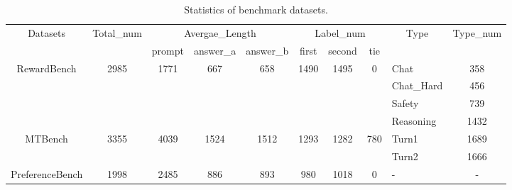 \documentclass[sigconf]{acmart}
\begin{document}
\begin{table}[ht]
\caption{Statistics of benchmark datasets.}
\begin{tabular}{c|c|ccc|ccc|lc}
\hline
\multirow{2}{*}{Datasets}    & \multirow{2}{*}{Total\_num} & \multicolumn{3}{c|}{Avergae\_Length}                                  & \multicolumn{3}{c|}{Label\_num}                                      & \multicolumn{1}{c}{\multirow{2}{*}{Type}} & \multirow{2}{*}{Type\_num} \\
                             &                             & prompt                & answer\_a             & answer\_b             & first                 & second                & tie                  & \multicolumn{1}{c}{}                      &                            \\ \hline
\multirow{4}{*}{RewardBench} & \multirow{4}{*}{2985}       & \multirow{4}{*}{1771} & \multirow{4}{*}{667}  & \multirow{4}{*}{658}  & \multirow{4}{*}{1490} & \multirow{4}{*}{1495} & \multirow{4}{*}{0}   & Chat                                      & 358                        \\
                             &                             &                       &                       &                       &                       &                       &                      & Chat\_Hard                                & 456                        \\
                             &                             &                       &                       &                       &                       &                       &                      & Safety                                    & 739                        \\
                             &                             &                       &                       &                       &                       &                       &                      & Reasoning                                 & 1432                       \\ \hline
\multirow{2}{*}{MTBench}     & \multirow{2}{*}{3355}       & \multirow{2}{*}{4039} & \multirow{2}{*}{1524} & \multirow{2}{*}{1512} & \multirow{2}{*}{1293} & \multirow{2}{*}{1282} & \multirow{2}{*}{780} & Turn1                                     & 1689                       \\
                             &                             &                       &                       &                       &                       &                       &                      & Turn2                                     & 1666                       \\ \hline
PreferenceBench              & 1998                        & 2485                  & 886                   & 893                   & 980                   & 1018                  & 0                    & -                                         & -                          \\ \hline
\end{tabular}


\label{data_sata}
\end{table}
\end{document}
